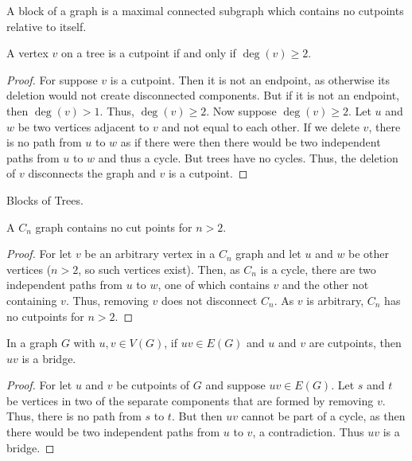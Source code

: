         \begin{definition}
        A block of a graph is a maximal connected subgraph which contains no cutpoints relative to itself.
        \end{definition}
        \begin{theorem}
        A vertex $v$ on a tree is a cutpoint if and only if $\deg(v) \geq 2$.
        \end{theorem}
        \begin{proof}
        For suppose $v$ is a cutpoint. Then it is not an endpoint, as otherwise its deletion would not create disconnected components. But if it is not an endpoint, then $\deg(v)>1$. Thus, $\deg(v)\geq 2$. Now suppose $\deg(v) \geq 2$. Let $u$ and $w$ be two vertices adjacent to $v$ and not equal to each other. If we delete $v$, there is no path from $u$ to $w$ as if there were then there would be two independent paths from $u$ to $w$ and thus a cycle. But trees have no cycles. Thus, the deletion of $v$ disconnects the graph and $v$ is a cutpoint.
        \end{proof}
        \begin{theorem}
        Blocks of Trees.
        \end{theorem}
        \begin{theorem}
        A $C_n$ graph contains no cut points for $n>2$.
        \end{theorem}
        \begin{proof}
        For let $v$ be an arbitrary vertex in a $C_n$ graph and let $u$ and $w$ be other vertices ($n>2$, so such vertices exist). Then, as $C_n$ is a cycle, there are two independent paths from $u$ to $w$, one of which contains $v$ and the other not containing $v$. Thus, removing $v$ does not disconnect $C_n$. As $v$ is arbitrary, $C_n$ has no cutpoints for $n>2$.
        \end{proof}
        \begin{theorem}
        In a graph $G$ with $u,v\in V(G)$, if $uv\in E(G)$ and $u$ and $v$ are cutpoints, then $uv$ is a bridge.
        \end{theorem}
        \begin{proof}
        For let $u$ and $v$ be cutpoints of $G$ and suppose $uv\in E(G)$. Let $s$ and $t$ be vertices in two of the separate components that are formed by removing $v$. Thus, there is no path from $s$ to $t$. But then $uv$ cannot be part of a cycle, as then there would be two independent paths from $u$ to $v$, a contradiction. Thus $uv$ is a bridge.
        \end{proof}
